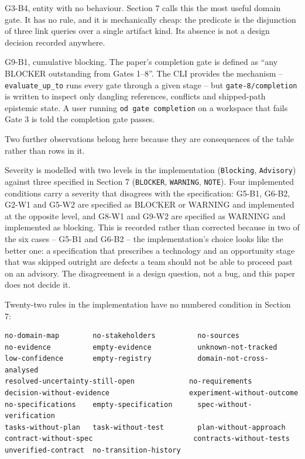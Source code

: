 \documentclass[11pt,a4paper]{article}
\begin{document}
G3-B4, entity with no behaviour. Section 7 calls this the most useful domain gate. It has no rule, and it is mechanically cheap: the predicate is the disjunction of three link queries over a single artifact kind. Its absence is not a design decision recorded anywhere.

G9-B1, cumulative blocking. The paper's completion gate is defined as ``any BLOCKER outstanding from Gates 1--8''. The CLI provides the mechanism -- \texttt{evaluate\_up\_to} runs every gate through a given stage -- but \texttt{gate-8/completion} is written to inspect only dangling references, conflicts and shipped-path epistemic state. A user running \texttt{od gate completion} on a workspace that fails Gate 3 is told the completion gate passes.

Two further observations belong here because they are consequences of the table rather than rows in it.

Severity is modelled with two levels in the implementation (\texttt{Blocking}, \texttt{Advisory}) against three specified in Section 7 (\texttt{BLOCKER}, \texttt{WARNING}, \texttt{NOTE}). Four implemented conditions carry a severity that disagrees with the specification: G5-B1, G6-B2, G2-W1 and G5-W2 are specified as BLOCKER or WARNING and implemented at the opposite level, and G8-W1 and G9-W2 are specified as WARNING and implemented as blocking. This is recorded rather than corrected because in two of the six cases -- G5-B1 and G6-B2 -- the implementation's choice looks like the better one: a specification that prescribes a technology and an opportunity stage that was skipped outright are defects a team should not be able to proceed past on an advisory. The disagreement is a design question, not a bug, and this paper does not decide it.

Twenty-two rules in the implementation have no numbered condition in Section 7:

\begin{Verbatim}[fontsize=\footnotesize,breaklines=true,breakanywhere=true,breakautoindent=false,samepage=false]
no-domain-map        no-stakeholders          no-sources
no-evidence          empty-evidence           unknown-not-tracked
low-confidence       empty-registry           domain-not-cross-analysed
resolved-uncertainty-still-open             no-requirements
decision-without-evidence                   experiment-without-outcome
no-specifications    empty-specification      spec-without-verification
tasks-without-plan   task-without-test        plan-without-approach
contract-without-spec                        contracts-without-tests
unverified-contract  no-transition-history
\end{Verbatim}
\end{document}

